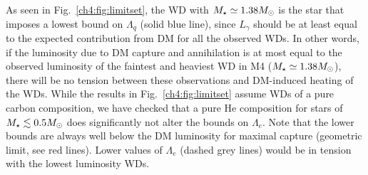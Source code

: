 As seen in Fig.~\ref{ch4:fig:limitset}, the WD with $M_\star\simeq1.38 M_\odot$ is the star that imposes a lowest bound on $\Lambda_q$ (solid blue line), since $L_\gamma$ should be at least equal to the expected contribution from DM for all the observed WDs. 
In other words, if the luminosity due to DM capture and annihilation is at most equal to the observed luminosity of the faintest and heaviest WD in M4 ($M_\star\simeq1.38 M_\odot$), there will be no tension between these observations and DM-induced heating of the WDs. 
While the results in Fig.~\ref{ch4:fig:limitset} assume WDs of a pure carbon composition, we have checked that a pure He composition for stars of $M_\star\lesssim0.5M_\odot$ does significantly not alter the bounds on $\Lambda_e$. 
Note that the lower bounds are always well below the DM luminosity for maximal capture (geometric limit, see red lines). 
Lower values of $\Lambda_e$ (dashed grey lines) would be in tension with the lowest luminosity WDs. 



